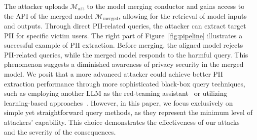 The attacker uploads $\mathcal{M}_\text{att}$ to the model merging conductor and gains access to the API of the merged model $\mathcal{M}_\text{merged}$, allowing for the retrieval of model inputs and outputs. Through direct PII-related queries, the attacker can extract target PII for specific victim users. The right part of Figure~\ref{fig:pipeline} illustrates a successful example of PII extraction. Before merging, the aligned model rejects PII-related queries, while the merged model responds to the harmful query. This phenomenon suggests a diminished awareness of privacy security in the merged model. We posit that a more advanced attacker could achieve better PII extraction performance through more sophisticated black-box query techniques, such as employing another LLM as the red-teaming assistant~\cite{chao2023jailbreaking} or utilizing learning-based approaches~\cite{yu2023gptfuzzer}. However, in this paper, we focus exclusively on simple yet straightforward query methods, as they represent the minimum level of attackers' capability. This choice demonstrates the effectiveness of our attacks and the severity of the consequences.

  



